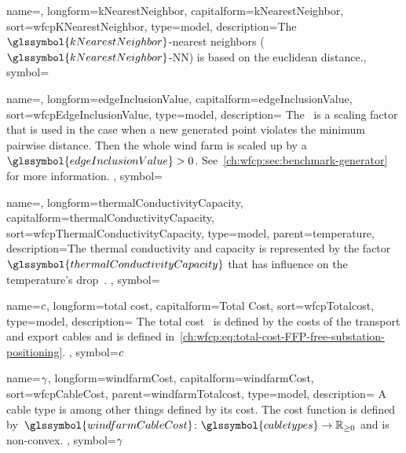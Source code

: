 {
    name={\kNearestNeighbor},
    longform={kNearestNeighbor},
    capitalform={kNearestNeighbor},
    sort={wfcpKNearestNeighbor},
    type={model},
    description={The~$\glssymbol{kNearestNeighbor}$-nearest neighbors
    ($\glssymbol{kNearestNeighbor}$-NN) is based on the euclidean distance.},
    symbol={\kNearestNeighbor}
}

{
    name={\edgeInclusionValue},
    longform={edgeInclusionValue},
    capitalform={edgeInclusionValue},
    sort={wfcpEdgeInclusionValue},
    type={model},
    description={ The~ is a scaling factor that is
    used in the case when a new generated point violates the minimum pairwise
    distance. Then the whole wind farm is scaled up by
    a~$\glssymbol{edgeInclusionValue}>0$.
    See~\cref{ch:wfcp:sec:benchmark-generator} for more information. },
    symbol={\edgeInclusionValue}
}

{
    name={\thermalConductivityCapacity},
    longform={thermalConductivityCapacity},
    capitalform={thermalConductivityCapacity},
    sort={wfcpThermalConductivityCapacity},
    type={model},
    parent={temperature},
    description={The thermal conductivity and capacity is represented by the
    factor~$\glssymbol{thermalConductivityCapacity}$ that has influence on the
    temperature's drop~. 
    },
    symbol={\thermalConductivityCapacity}
}

{
    name={\ensuremath{\totalcost}},
    longform={total cost},
    capitalform={Total Cost},
    sort={wfcpTotalcost},
    type={model},
    description={ The total cost~ is defined by the
    costs of the transport and export cables and is defined in~\cref{ch:wfcp:eq:total-cost-FFP-free-substation-positioning}. },
    symbol={\ensuremath{\totalcost}}
}

{
    name={\ensuremath{\cost}},
    longform={windfarmCost},
    capitalform={windfarmCost},
    sort={wfcpCableCost},
    parent={windfarmTotalcost},
    type={model},
    description={ A cable type is among other things defined by its cost. The
    cost function is defined by~$\glssymbol{windfarmCableCost}\colon
    \glssymbol{cabletypes}\to\posreals$ and is non-convex.
    },
    symbol={\ensuremath{\cost}}
}


